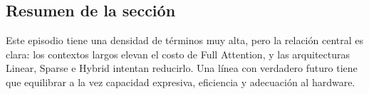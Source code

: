 \subsection{Resumen de la sección}

Este episodio tiene una densidad de términos muy alta, pero la relación central es clara: los contextos largos elevan el costo de Full Attention, y las arquitecturas Linear, Sparse e Hybrid intentan reducirlo. Una línea con verdadero futuro tiene que equilibrar a la vez capacidad expresiva, eficiencia y adecuación al hardware.
